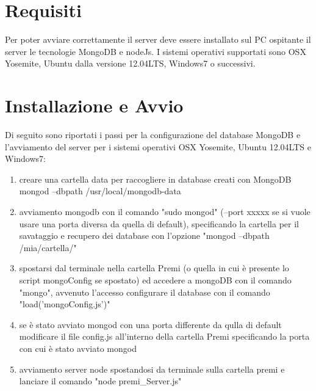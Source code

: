 \documentclass[a4paper,12pt]{article}
\title{\titoloDoc}
\newcommand{\parti}{./parti/}
\newcommand{\temp}{../../Template/}
\begin{document}
	\newpage
	\newpage
	\newpage
	\tableofcontents %
	\newpage
	\listoffigures
	\listoftables
	\newpage
	
	\newpage

\section{Requisiti}
Per poter avviare correttamente il server deve essere installato sul PC ospitante il server le tecnologie MongoDB e nodeJs. I sistemi operativi supportati sono OSX Yosemite, Ubuntu dalla versione 12.04LTS, Windows7 o successivi.

\section{Installazione e Avvio}

Di seguito sono riportati i passi per la configurazione del database MongoDB e l'avviamento del server per i sistemi operativi OSX Yosemite, Ubuntu  12.04LTS e Windows7:

\begin{enumerate}
\item creare una cartella data per raccogliere in database creati con MongoDB
mongod --dbpath /usr/local/mongodb-data
\item avviamento mongodb con il comando "sudo mongod" (--port xxxxx se si vuole usare una porta diversa da quella di default), specificando la cartella per il savataggio e recupero dei database con l'opzione "mongod --dbpath /mia/cartella/"
\item  spostarsi dal terminale nella cartella Premi (o quella in cui \`{e} presente lo script mongoConfig se spostato) ed accedere a mongoDB con il comando "mongo", avvenuto l'accesso configurare il database con il comando "load('mongoConfig.js')"
\item se \`{e} stato avviato mongod con una porta differente da qulla di default modificare il file config.js all'interno della cartella Premi specificando la porta con cui \`{e} stato avviato mongod
\item  avviamento server node spostandosi da terminale sulla cartella premi e lanciare il comando "node premi\_Server.js" %

\end{enumerate}

	
\end{document}
